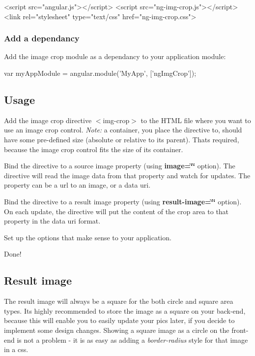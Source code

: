 \begin{DoxyCode}
<script src="angular.js"></script>
<script src="ng-img-crop.js"></script>
<link rel="stylesheet" type="text/css" href="ng-img-crop.css">
\end{DoxyCode}


\subsubsection*{Add a dependancy}

Add the image crop module as a dependancy to your application module\+:


\begin{DoxyCode}
var myAppModule = angular.module('MyApp', ['ngImgCrop']);
\end{DoxyCode}


\subsection*{Usage}


\begin{DoxyEnumerate}
\item Add the image crop directive {\ttfamily $<$img-\/crop$>$} to the H\+T\+ML file where you want to use an image crop control. {\itshape Note\+:} a container, you place the directive to, should have some pre-\/defined size (absolute or relative to its parent). That\textquotesingle{}s required, because the image crop control fits the size of its container.
\item Bind the directive to a source image property (using {\bfseries image=\char`\"{}\char`\"{}} option). The directive will read the image data from that property and watch for updates. The property can be a url to an image, or a data uri.
\item Bind the directive to a result image property (using {\bfseries result-\/image=\char`\"{}\char`\"{}} option). On each update, the directive will put the content of the crop area to that property in the data uri format.
\item Set up the options that make sense to your application.
\item Done!
\end{DoxyEnumerate}

\subsection*{Result image}

The result image will always be a square for the both circle and square area types. It\textquotesingle{}s highly recommended to store the image as a square on your back-\/end, because this will enable you to easily update your pics later, if you decide to implement some design changes. Showing a square image as a circle on the front-\/end is not a problem -\/ it is as easy as adding a {\itshape border-\/radius} style for that image in a css.

